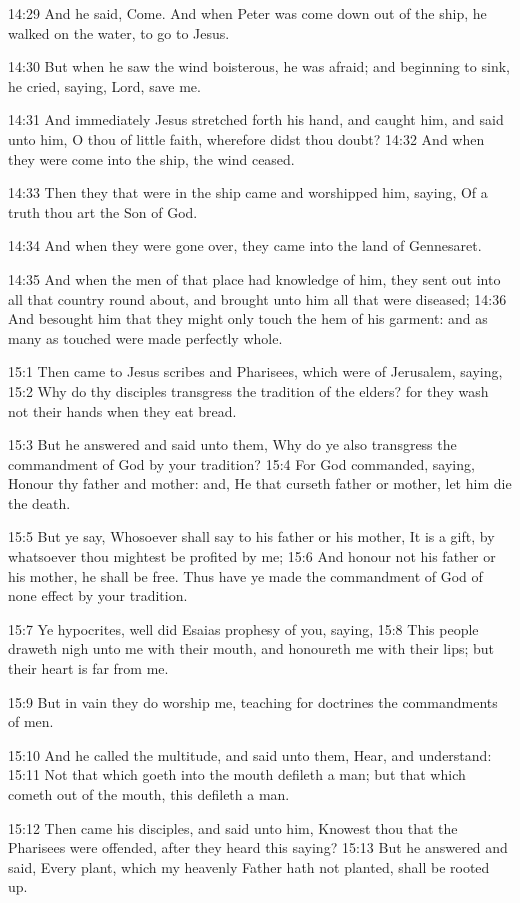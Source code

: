 14:29 And he said, Come. And when Peter was come down out of the ship,
he walked on the water, to go to Jesus.

14:30 But when he saw the wind boisterous, he was afraid; and
beginning to sink, he cried, saying, Lord, save me.

14:31 And immediately Jesus stretched forth his hand, and caught him,
and said unto him, O thou of little faith, wherefore didst thou doubt?
14:32 And when they were come into the ship, the wind ceased.

14:33 Then they that were in the ship came and worshipped him, saying,
Of a truth thou art the Son of God.

14:34 And when they were gone over, they came into the land of
Gennesaret.

14:35 And when the men of that place had knowledge of him, they sent
out into all that country round about, and brought unto him all that
were diseased; 14:36 And besought him that they might only touch the
hem of his garment: and as many as touched were made perfectly whole.

15:1 Then came to Jesus scribes and Pharisees, which were of
Jerusalem, saying, 15:2 Why do thy disciples transgress the tradition
of the elders? for they wash not their hands when they eat bread.

15:3 But he answered and said unto them, Why do ye also transgress the
commandment of God by your tradition?  15:4 For God commanded, saying,
Honour thy father and mother: and, He that curseth father or mother,
let him die the death.

15:5 But ye say, Whosoever shall say to his father or his mother, It
is a gift, by whatsoever thou mightest be profited by me; 15:6 And
honour not his father or his mother, he shall be free. Thus have ye
made the commandment of God of none effect by your tradition.

15:7 Ye hypocrites, well did Esaias prophesy of you, saying, 15:8 This
people draweth nigh unto me with their mouth, and honoureth me with
their lips; but their heart is far from me.

15:9 But in vain they do worship me, teaching for doctrines the
commandments of men.

15:10 And he called the multitude, and said unto them, Hear, and
understand: 15:11 Not that which goeth into the mouth defileth a man;
but that which cometh out of the mouth, this defileth a man.

15:12 Then came his disciples, and said unto him, Knowest thou that
the Pharisees were offended, after they heard this saying?  15:13 But
he answered and said, Every plant, which my heavenly Father hath not
planted, shall be rooted up.

